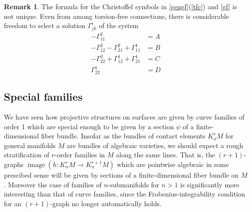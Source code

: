 \documentclass[12pt]{article}
\numberwithin{equation}{section}
\theoremstyle{plain}
\theoremstyle{definition}
\newtheorem{remark}[definition]{Remark}
\renewcommand{\P}{\mathbb{P}}
\newcommand{\ra}{\rightarrow}
\begin{document}
\begin{remark} The formula for the Christoffel symbols in \ref{gengf}(\ref{tfc}) and \ref{gf} is not unique. Even from among torsion-free connections, there is considerable freedom to select a solution $\Gamma^{i}_{jk}$ of the system
\begin{align*}
-\Gamma^{2}_{11}&=A\\
-\Gamma^{2}_{12}-\Gamma^{2}_{21} +\Gamma^{1}_{11}&=B\\
-\Gamma^{2}_{22}+\Gamma^{1}_{12} +\Gamma^{1}_{21}&=C\\
\Gamma^{1}_{22}&=D
\end{align*}
\end{remark}


\subsection{Special families}

We have seen how projective structures on surfaces are given by curve families of order 1 which are special enough to be given by a section $\psi$ of a finite-dimensional fiber bundle. Insofar as the bundles of contact elements $K^{r}_{n}M$ for general manifolds $M$ are bundles of algebraic varieties, we should expect a rough stratification of $r$-order families in $M$ along the same lines. That is, the $(r+1)$-graphs $\operatorname{image}(h:K^{r}_{n}M\ra K^{r+1}_{n}M)$ which are pointwise algebraic in some prescibed sense will be given by sections of a finite-dimensional fiber bundle on $M$. Moreover the case of families of $n$-submanifolds for $n>1$ is significantly more interesting than that of curve families, since the Frobenius-integrability condition for an $(r+1)$-graph no longer automatically holds.
\end{document}
